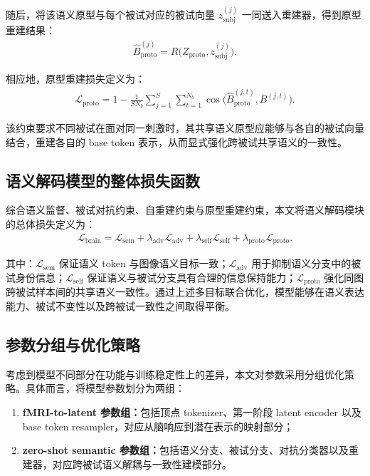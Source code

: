 随后，将该语义原型与每个被试对应的被试向量 $z_{\mathrm{subj}}^{(j)}$ 一同送入重建器，得到原型重建结果：
\begin{align}
  \hat{B}_{\mathrm{proto}}^{(j)} = R\bigl(Z_{\mathrm{proto}}, z_{\mathrm{subj}}^{(j)}\bigr).
\end{align}

相应地，原型重建损失定义为：
\begin{align}
  \mathcal{L}_{\mathrm{proto}} = 1 - \frac{1}{S N_b} \sum_{j=1}^{S} \sum_{t=1}^{N_b} \cos\bigl(\hat{B}_{\mathrm{proto}}^{(j,t)}, B^{(j,t)}\bigr).
\end{align}

该约束要求不同被试在面对同一刺激时，其共享语义原型应能够与各自的被试向量结合，重建各自的 base token 表示，从而显式强化跨被试共享语义的一致性。

\subsection{语义解码模型的整体损失函数}

综合语义监督、被试对抗约束、自重建约束与原型重建约束，本文将语义解码模块的总体损失定义为：
\begin{align}
  \mathcal{L}_{\mathrm{brain}} = \mathcal{L}_{\mathrm{sem}} + \lambda_{\mathrm{adv}} \mathcal{L}_{\mathrm{adv}} + \lambda_{\mathrm{self}} \mathcal{L}_{\mathrm{self}} + \lambda_{\mathrm{proto}} \mathcal{L}_{\mathrm{proto}}.
\end{align}

其中：$\mathcal{L}_{\mathrm{sem}}$ 保证语义 token 与图像语义目标一致；$\mathcal{L}_{\mathrm{adv}}$ 用于抑制语义分支中的被试身份信息；$\mathcal{L}_{\mathrm{self}}$ 保证语义与被试分支具有合理的信息保持能力；$\mathcal{L}_{\mathrm{proto}}$ 强化同图跨被试样本间的共享语义一致性。通过上述多目标联合优化，模型能够在语义表达能力、被试不变性以及跨被试一致性之间取得平衡。

\subsection{参数分组与优化策略}

考虑到模型不同部分在功能与训练稳定性上的差异，本文对参数采用分组优化策略。具体而言，将模型参数划分为两组：
\begin{enumerate}
  \item \textbf{fMRI-to-latent 参数组：}包括顶点 tokenizer、第一阶段 latent encoder 以及 base token resampler，对应从脑响应到潜在表示的映射部分；
  \item \textbf{zero-shot semantic 参数组：}包括语义分支、被试分支、对抗分类器以及重建器，对应跨被试语义解耦与一致性建模部分。
\end{enumerate}


